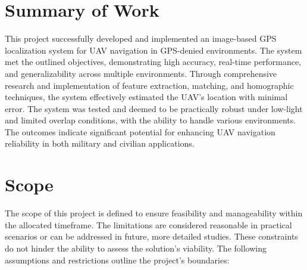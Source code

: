 \section{Summary of Work}
This project successfully developed and implemented an image-based GPS localization system for UAV navigation in GPS-denied environments. The system met the outlined objectives, demonstrating high accuracy, real-time performance, and generalizability across multiple environments. Through comprehensive research and implementation of feature extraction, matching, and homographic techniques, the system effectively estimated the UAV's location with minimal error. The system was tested and deemed to be practically robust under low-light and limited overlap conditions, with the ability to handle various environments. The outcomes indicate significant potential for enhancing UAV navigation reliability in both military and civilian applications.

\section{Scope}
\label{sec:scope}
The scope of this project is defined to ensure feasibility and manageability within the allocated timeframe. The limitations are considered reasonable in practical scenarios or can be addressed in future, more detailed studies. These constraints do not hinder the ability to assess the solution's viability. The following assumptions and restrictions outline the project's boundaries:


